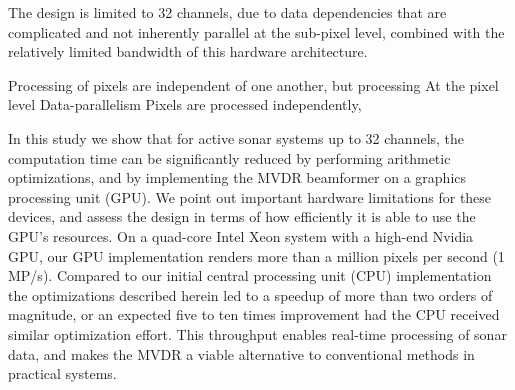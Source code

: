 The design is limited to 32 channels, due to data dependencies that are complicated and not inherently parallel at the sub-pixel level, combined with the relatively limited bandwidth of this hardware architecture. 

Processing of pixels are independent of one another, but processing
At the pixel level Data-parallelism Pixels are processed independently, 


In this study we show that for active sonar systems up to 32 channels, the computation time
can be significantly reduced by performing arithmetic optimizations, and by implementing
the MVDR beamformer on a graphics processing unit (GPU). We point out important
hardware limitations for these devices, and assess the design in terms of how efficiently it is
able to use the GPU’s resources. On a quad-core Intel Xeon system with a high-end Nvidia
GPU, our GPU implementation renders more than a million pixels per second (1 MP/s).
Compared to our initial central processing unit (CPU) implementation the optimizations
described herein led to a speedup of more than two orders of magnitude, or an expected
five to ten times improvement had the CPU received similar optimization effort. This
throughput enables real-time processing of sonar data, and makes the MVDR a viable
alternative to conventional methods in practical systems.



%

%


